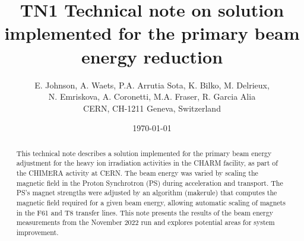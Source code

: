 \documentclass{cernatsnote}
\title{TN1 Technical note on solution implemented for the primary beam energy reduction}
\author{
	E. Johnson, A. Waets, P.A. Arrutia Sota, K. Bilko, M. Delrieux,\\ N. Emriskova, A. Coronetti,  M.A. Fraser, R. Garcia Alia\; \\		
	CERN, CH-1211 Geneva, Switzerland
}
\date{\today}
\begin{document}
\maketitle

\begin{abstract}
This technical note describes a solution implemented for the primary beam energy adjustment for the heavy ion irradiation activities in the CHARM facility, as part of the CHIMERA activity at CERN. The beam energy was varied by scaling the magnetic field in the Proton Synchrotron (PS) during acceleration and transport. The PS's magnet strengths were adjusted by an algorithm (makerule) that computes the magnetic field required for a given beam energy, allowing automatic scaling of magnets in the F61 and T8 transfer lines. This note presents the results of the beam energy measurements from the November 2022 run and explores potential areas for system improvement.
\end{abstract}
\\ \\ \\ 

\newpage
\end{document}
